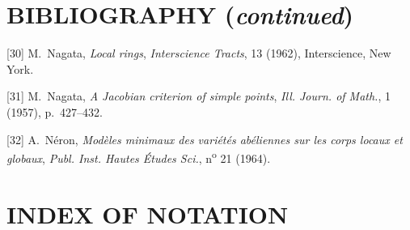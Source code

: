 \section*{BIBLIOGRAPHY (\emph{continued})}

\begingroup
\small
\setlength{\parindent}{0pt}
\setlength{\parskip}{3pt}
[30] M.~Nagata, \emph{Local rings}, \emph{Interscience Tracts}, 13 (1962),
Interscience, New York.

[31] M.~Nagata, \emph{A Jacobian criterion of simple points},
\emph{Ill. Journ. of Math.}, 1 (1957), p.~427--432.

[32] A.~Néron, \emph{Modèles minimaux des variétés abéliennes sur les corps
locaux et globaux}, \emph{Publ. Inst. Hautes Études Sci.}, n\textsuperscript{o}
21 (1964).

\clearpage
{}
{}

\section*{INDEX OF NOTATION}


